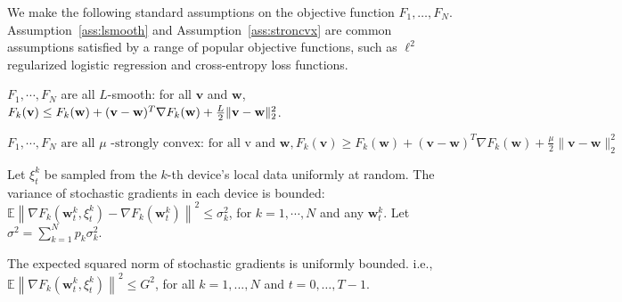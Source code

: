 We make the following standard assumptions on the objective function $F_1,\dots, F_N$. Assumption~\ref{ass:lsmooth} and Assumption~\ref{ass:stroncvx} are common assumptions satisfied by a range of popular objective functions, such as $\ell^{2}$ regularized logistic regression and cross-entropy loss functions.


\begin{assumption}[L-smooth]
	$F_{1}, \cdots, F_{N}$ are all $L$-smooth: for all  $\mathbf{v}$  and $\mathbf{w}$, $F_{k}(\mathbf{v}) \leq F_{k}(\mathbf{w})+(\mathbf{v}- \\ \mathbf{w})^{T} \nabla F_{k}(\mathbf{w})+\frac{L}{2}\|\mathbf{v}-\mathbf{w}\|_{2}^{2}$.
	\label{ass:lsmooth}
\end{assumption}
\begin{assumption}
	$	F_{1}, \cdots, F_{N} \text { are all } \mu \text { -strongly convex: for all v and } \mathbf{w}, F_{k}(\mathbf{v}) \geq F_{k}(\mathbf{w})+(\mathbf{v}-\mathbf{w})^{T} \nabla F_{k}(\mathbf{w})+\frac{\mu}{2}\|\mathbf{v}-\mathbf{w}\|_{2}^{2}$
	\label{ass:stroncvx}
\end{assumption}
\begin{assumption}
	Let $\xi_{t}^{k}$ be sampled from the $k$-th device's local data uniformly at random. The variance of stochastic gradients in each device is bounded: $\mathbb{E}\left\|\nabla F_{k}\left(\mathbf{w}_{t}^{k}, \xi_{t}^{k}\right)-\nabla F_{k}\left(\mathbf{w}_{t}^{k}\right)\right\|^{2} \leq \sigma_{k}^{2}$,
	for $k=1, \cdots, N$ and any $\mathbf{w}_{t}^{k}$. Let $\sigma^2=\sum_{k=1}^{N}p_k\sigma_{k}^{2}$.
	\label{ass:boundedvariance}
\end{assumption}
\begin{assumption}
	The expected squared norm of stochastic gradients is uniformly bounded. i.e.,
	$\mathbb{E}\left\|\nabla F_{k}\left(\mathbf{w}_{t}^{k}, \xi_{t}^{k}\right)\right\|^{2} \leq G^{2}$, for all $k = 1,..., N$ and $t=0, \dots, T-1$.
	\label{ass:subgrad2}
\end{assumption}

